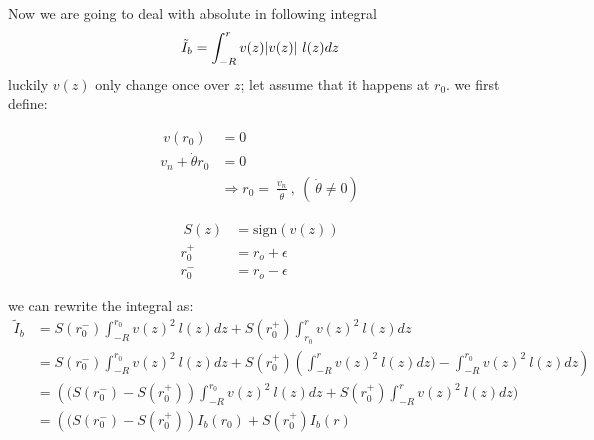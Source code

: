 \documentclass{article}
\DeclarePairedDelimiter\abs{\lvert}{\rvert}%
\begin{document}
Now we are going to deal with absolute in following integral
\begin{align}\label{eq:two_int}
\tilde{I}_b = \int _{-R}^{r} v(z) \abs{v(z) }~l(z)dz
\end{align}
luckily $v(z)$ only change once over $z$; let assume that it happens at $r_0$. we first define: 

\begin{align}\label{eq:two_int}\
	v(r_0) &= 0\\	
	v_n + \dot{\theta}r_0 &= 0\\
	&\Rightarrow r_0 = ~ \frac{v_n}{\dot{\theta}}~, ~(~\dot{\theta} \neq 0)
\end{align}

\begin{align}\label{eq:two_int}\
	S(z)  &= \mathrm{sign}\left(v(z)\right)\\
	r_0^+ &= r_o + \epsilon\\
	r_0^- &= r_o - \epsilon
\end{align}

we can rewrite the integral as:
\begin{align}\label{eq:two_int}
\tilde{I}_b &= S(r_0^-) \int _{-R}^{r_0} v(z)^2~ l(z)dz + S(r_0^+) \int _{r_0}^{r} v(z)^2~ l(z)dz \\
			&= S(r_0^-) \int _{-R}^{r_0} v(z)^2~ l(z)dz + S(r_0^+) \left( \int _{-R}^{r} v(z)^2~ l(z)dz ) -  
			\int _{-R}^{r_0} v(z)^2~ l(z)dz \right)\\
			&= \left( (S(r_0^-)-S(r_0^+) \right)  \int _{-R}^{r_0} v(z)^2~ l(z)dz + S(r_0^+) \int _{-R}^{r} v(z)^2~ l(z)dz ) \\
			&= \left( (S(r_0^-)-S(r_0^+) \right)  I_b(r_0) + S(r_0^+) I_b(r)
\end{align}
\end{document}
